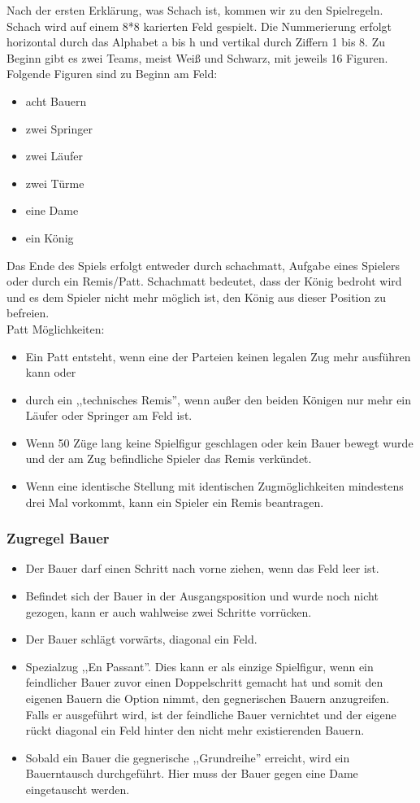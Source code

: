 \documentclass[12pt,a4paper]{article}
\begin{document}
Nach der ersten Erklärung, was Schach ist, kommen wir zu den Spielregeln.
Schach wird auf einem 8*8 karierten Feld gespielt. Die Nummerierung erfolgt horizontal durch das Alphabet a bis h und vertikal durch Ziffern 1 bis 8.
Zu Beginn gibt es zwei Teams, meist Weiß und Schwarz, mit jeweils 16 Figuren.
Folgende Figuren sind zu Beginn am Feld:
\begin{itemize}
	\item{acht Bauern}
	\item{zwei Springer}
	\item{zwei Läufer}
	\item{zwei Türme}
	\item{eine Dame}
	\item{ein König}
\end{itemize}
Das Ende des Spiels erfolgt entweder durch schachmatt, Aufgabe eines Spielers oder durch ein Remis/Patt. Schachmatt bedeutet, dass der König bedroht wird und es dem Spieler nicht mehr möglich ist, den König aus dieser Position zu befreien.\\
Patt Möglichkeiten:
\begin{itemize}
	\item{Ein Patt entsteht, wenn eine der Parteien keinen legalen Zug mehr ausführen kann oder }
	\item{durch ein ,,technisches Remis'', wenn außer den beiden Königen nur mehr ein Läufer oder Springer am Feld ist.}
	\item{Wenn 50 Züge lang keine Spielfigur geschlagen oder kein Bauer bewegt wurde und der am Zug befindliche Spieler das Remis verkündet.}
	\item{Wenn eine identische Stellung mit identischen Zugmöglichkeiten mindestens drei Mal vorkommt, kann ein Spieler ein Remis beantragen.}
\end{itemize}

\subsubsection{Zugregel Bauer}
\label{SUBSUBSEC:PAWN}
\begin{itemize}
	\item{Der Bauer darf einen Schritt nach vorne ziehen, wenn das Feld leer ist.}
	\item{Befindet sich der Bauer in der Ausgangsposition und wurde noch nicht gezogen, kann er auch wahlweise zwei Schritte vorrücken.}
	\item{Der Bauer schlägt vorwärts, diagonal ein Feld.}
	\item{Spezialzug ,,En Passant''. Dies kann er als einzige Spielfigur, wenn ein feindlicher Bauer zuvor einen Doppelschritt gemacht hat und somit den eigenen Bauern die Option nimmt, den gegnerischen Bauern anzugreifen. Falls er ausgeführt wird, ist der feindliche Bauer vernichtet und der eigene rückt diagonal ein Feld hinter den nicht mehr existierenden Bauern.}
	\item{Sobald ein Bauer die gegnerische ,,Grundreihe'' erreicht, wird ein Bauerntausch durchgeführt. Hier muss der Bauer gegen eine Dame eingetauscht werden.}
\end{itemize}
\end{document}
